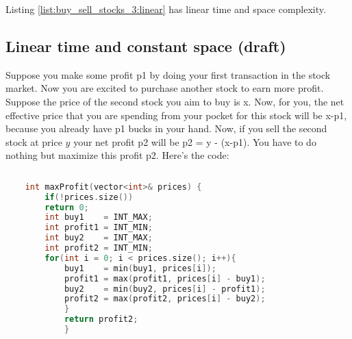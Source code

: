 Listing \ref{list:buy_sell_stocks_3:linear} has linear time and space complexity.


\subsection{Linear time and constant space (draft)}
Suppose you make some profit p1 by doing your first transaction in the stock market. Now you are excited to purchase another stock to earn more profit. Suppose the price of the second stock you aim to buy is x. Now, for you, the net effective price that you are spending from your pocket for this stock will be x-p1, because you already have p1 bucks in your hand. Now, if you sell the second stock at price $y$ your net profit p2 will be p2 = y - (x-p1). You have to do nothing but maximize this profit p2. Here's the code:
\begin{lstlisting}[language=c++,numbers=none, caption={}]
          
    int maxProfit(vector<int>& prices) {
        if(!prices.size())
        return 0;
        int buy1    = INT_MAX;
        int profit1 = INT_MIN;
        int buy2    = INT_MAX;
        int profit2 = INT_MIN;
        for(int i = 0; i < prices.size(); i++){
            buy1    = min(buy1, prices[i]);
            profit1 = max(profit1, prices[i] - buy1);
            buy2    = min(buy2, prices[i] - profit1);
            profit2 = max(profit2, prices[i] - buy2);
            }
            return profit2;
            }
        \end{lstlisting} 